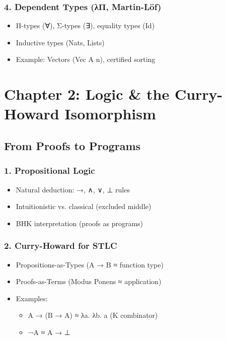 \documentclass[11pt]{article}
\begin{document}
\subsubsection{4. Dependent Types (λΠ, Martin-Löf)}
\label{sec:org99b8870}
\begin{itemize}
\item Π-types (∀), Σ-types (∃), equality types (Id)
\item Inductive types (Nats, Lists)
\item Example: Vectors (Vec A n), certified sorting
\end{itemize}

\section{Chapter 2: Logic \& the Curry-Howard Isomorphism}
\label{sec:orga258183}
\subsection{From Proofs to Programs}
\label{sec:org88ce455}
\subsubsection{1. Propositional Logic}
\label{sec:org496ea13}
\begin{itemize}
\item Natural deduction: →, ∧, ∨, ⊥ rules
\item Intuitionistic vs. classical (excluded middle)
\item BHK interpretation (proofs as programs)
\end{itemize}

\subsubsection{2. Curry-Howard for STLC}
\label{sec:org7e9739b}
\begin{itemize}
\item Propositions-as-Types (A → B ≈ function type)
\item Proofs-as-Terms (Modus Ponens ≈ application)
\item Examples:  
\begin{itemize}
\item A → (B → A) ≈ λa. λb. a (K combinator)
\item ¬A ≈ A → ⊥
\end{itemize}
\end{itemize}
\end{document}
